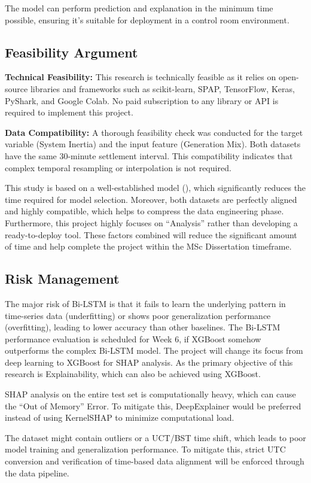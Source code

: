\documentclass[12pt,a4paper,onecolumn]{article}
\begin{document}
The model can perform prediction and explanation in the minimum time possible, ensuring it's suitable for deployment in a control room environment.

\subsection{Feasibility Argument}
\textbf{Technical Feasibility:} This research is technically feasible as it relies on open-source libraries and frameworks such as scikit-learn, SPAP, TensorFlow, Keras, PyShark, and Google Colab. No paid subscription to any library or API is required to implement this project.

\textbf{Data Compatibility:} A thorough feasibility check was conducted for the target variable (System Inertia) and the input feature (Generation Mix). Both datasets have the same 30-minute settlement interval. This compatibility indicates that complex temporal resampling or interpolation is not required.

This study is based on a well-established model (\cite{dey2025system}), which significantly reduces the time required for model selection. Moreover, both datasets are perfectly aligned and highly compatible, which helps to compress the data engineering phase. Furthermore, this project highly focuses on “Analysis” rather than developing a ready-to-deploy tool. These factors combined will reduce the significant amount of time and help complete the project within the MSc Dissertation timeframe.

\subsection{Risk Management}
The major risk of Bi-LSTM is that it fails to learn the underlying pattern in time-series data (underfitting) or shows poor generalization performance (overfitting), leading to lower accuracy than other baselines. The Bi-LSTM performance evaluation is scheduled for Week 6, if XGBoost somehow outperforms the complex Bi-LSTM model. The project will change its focus from deep learning to XGBoost for SHAP analysis. As the primary objective of this research is Explainability, which can also be achieved using XGBoost.

SHAP analysis on the entire test set is computationally heavy, which can cause the “Out of Memory” Error. To mitigate this, DeepExplainer would be preferred instead of using KernelSHAP to minimize computational load.

The dataset might contain outliers or a UCT/BST time shift, which leads to poor model training and generalization performance. To mitigate this, strict UTC conversion and verification of time-based data alignment will be enforced through the data pipeline.
\end{document}
